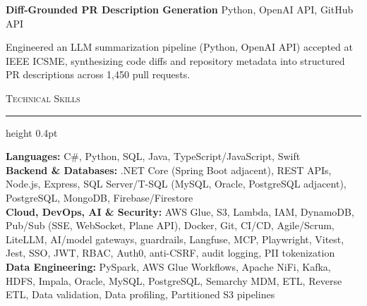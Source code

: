 \documentclass[letterpaper,11pt]{article}
\newcommand{\resumesection}[1]{%
  \par\vspace{2pt}%
  {\large\scshape #1}\par\vspace{2pt}%
  \hrule height 0.4pt\vspace{2pt}%
}
\newcommand{\projectHeading}[2]{
  \textbf{#1} \hfill #2
}
\begin{document}
\projectHeading{Diff-Grounded PR Description Generation}{Python, OpenAI API, GitHub API}
\begin{tightitemize}
  \item Engineered an LLM summarization pipeline (Python, OpenAI API) accepted at IEEE ICSME, synthesizing code diffs and repository metadata into structured PR descriptions across 1,450 pull requests.
\end{tightitemize}

\resumesection{Technical Skills}
\textbf{Languages:} C\#, Python, SQL, Java, TypeScript/JavaScript, Swift\\
\textbf{Backend \& Databases:} .NET Core (Spring Boot adjacent), REST APIs, Node.js, Express, SQL Server/T-SQL (MySQL, Oracle, PostgreSQL adjacent), PostgreSQL, MongoDB, Firebase/Firestore\\
\textbf{Cloud, DevOps, AI \& Security:} AWS Glue, S3, Lambda, IAM, DynamoDB, Pub/Sub (SSE, WebSocket, Plane API), Docker, Git, CI/CD, Agile/Scrum, LiteLLM, AI/model gateways, guardrails, Langfuse, MCP, Playwright, Vitest, Jest, SSO, JWT, RBAC, Auth0, anti-CSRF, audit logging, PII tokenization\\
\textbf{Data Engineering:} PySpark, AWS Glue Workflows, Apache NiFi, Kafka, HDFS, Impala, Oracle, MySQL, PostgreSQL, Semarchy MDM, ETL, Reverse ETL, Data validation, Data profiling, Partitioned S3 pipelines
\end{document}
